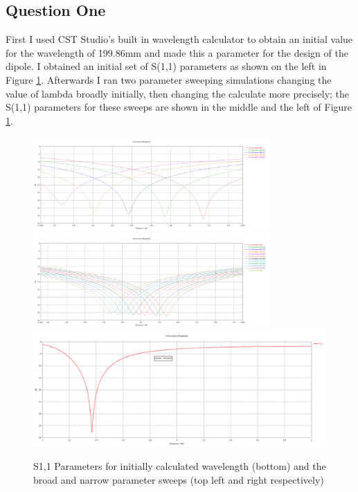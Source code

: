 \documentclass[colorlinks,11pt,a4paper,normalphoto,withhyper,ragged2e]{altareport}
\begin{document}
\subsection{Question One}
First I used CST Studio's built in wavelength calculator to obtain an initial value for the wavelength of 199.86mm and made this a parameter for the design of the dipole. I obtained an initial set of S(1,1) parameters as shown on the left in Figure \ref{fig:hw_s11_params_init_sweeps}. Afterwards I ran two parameter sweeping simulations changing the value of lambda broadly initially, then changing the calculate more precisely; the S(1,1) parameters for these sweeps are shown in the middle and the left of Figure \ref{fig:hw_s11_params_init_sweeps}.

\begin{figure}[h]
	\centering
	\hspace{\fill}\includegraphics[width=9cm,valign=c]{Images/hw-lambda-sweep-broad-S1,1.png}\hspace{\fill}\includegraphics[width=9cm,valign=c]{Images/hw-lambda-sweep-narrow-S1,1.png}\hspace{\fill}
	\includegraphics[width=12cm,valign=c]{Images/hw-lambda-199.86-S1,1.png}
	\caption{S1,1 Parameters for initially calculated wavelength (bottom) and the broad and narrow parameter sweeps (top left and right respectively)}  %
	\label{fig:hw_s11_params_init_sweeps}
\end{figure}
\end{document}
